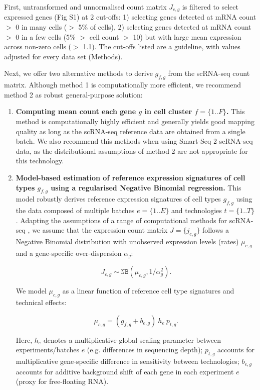 \documentclass[11pt,a4paper]{article}
\begin{document}
First, untransformed and unnormalised count matrix $J_{c,g}$ is filtered to select expressed genes (Fig S1) at 2 cut-offs: 1) selecting genes detected at mRNA count $>$ 0 in many cells ($>$ 5\% of cells), 2) selecting genes detected at mRNA count $>$ 0 in a few cells (5\% $>$ cell count $>$ 10) but with large mean expression across non-zero cells ($>$ 1.1). The cut-offs listed are a guideline, with values adjusted for every data set (Methods).  

Next, we offer two alternative methods to derive $g_{f,g}$ from the scRNA-seq count matrix. Although method 1 is computationally more efficient, we recommend method 2 as robust general-purpose solution:

\begin{enumerate}
    \item \textbf{Computing mean count each gene $g$ in cell cluster $f=\{1..F\}$.} This method is  computationally highly efficient and generally yields good mapping quality as long as the scRNA-seq reference data are obtained from a single batch. We also recommend this methods when using Smart-Seq 2 scRNA-seq data, as the distributional assumptions of method 2 are not appropriate for this technology.
    \item \textbf{Model-based estimation of reference expression signatures of cell types $g_{f,g}$ using a regularised Negative Binomial regression.} This model robustly derives reference expression signatures of cell types $g_{f,g}$ using the data composed of multiple batches $e=\{1..E\}$ and technologies $t=\{1..T\}$. Adapting the assumptions of a range of computational methods for scRNA-seq \autocite{lopez_deep_2018, love_moderated_2014}, we assume that the expression count matrix $J=\{j_{c,g}\}$ follows a Negative Binomial distribution with unobserved expression levels (rates) $\mu_{c,g}$ and a gene-specific over-dispersion $\alpha_g$:
    \begin{linenomath*} \begin{equation} \label{eq:c2l_ref_prog:1}
    J_{c,g} \sim \mathtt{NB}(\mu_{c,g}, 1 / \alpha_g^2).
    \end{equation} \end{linenomath*}
    
    We model $\mu_{c,g}$ as a linear function of reference cell type signatures and technical effects:
    \begin{linenomath*} \begin{equation} \label{eq:c2l_ref_prog:2}
    \mu_{c,g} = (g_{f,g} + b_{e,g}) \: {h_e} \: p_{t,g}.
    \end{equation} \end{linenomath*}
    Here, $h_e$ denotes a multiplicative global scaling parameter between experiments/batches $e$ (e.g. differences in sequencing depth); $p_{t,g}$ accounts for multiplicative gene-specific difference in sensitivity between technologies; $b_{e,g}$ accounts for additive background shift of each gene in each experiment $e$ (proxy for free-floating RNA).
    

\end{enumerate}
\end{document}
